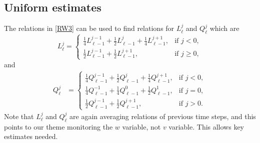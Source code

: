 \documentclass[a4paper,11pt]{article}
\def\l{{h}}
\theoremstyle{remark}
\begin{document}
\subsection{Uniform estimates}
The relations in \eqref{RW3} can be used to find relations for $L^j_\ell$ and $Q^j_\ell$ which are
\begin{equation} \label{eq:L}
L^j_\ell = \left\{\begin{array}{ll}
        \frac{1}{4}L_{\ell-1}^{j-1} + \frac{1}{2}L_{\ell-1}^j +
        \frac{1}{4}L_{\ell-1}^{j+1}, & \text{if $j<0$},\\
        \frac{1}{2}L_{\ell-1}^{j-1} + \frac{1}{2}L_{\ell-1}^{j+1}, &
        \text{if $j\ge0$},
        \end{array}\right.
\end{equation}
and
\begin{equation}\label{eq:Q}
\begin{aligned}
Q^j_\ell %
&=\left\{\begin{array}{ll}
        \frac{1}{4}Q_{\ell-1}^{j-1} + \frac{1}{2}Q_{\ell-1}^{j} +
        \frac{1}{4}Q_{\ell-1}^{j+1}, & \text{if $j<0$},\\
        \frac{1}{4}Q_{\ell-1}^{-1} + \frac{1}{4}Q_{\ell-1}^{0} +
        \frac{1}{2}Q_{\ell-1}^{1}, & \text{if $j=0$},\\
        \frac{1}{2}Q_{\ell-1}^{j-1} + \frac{1}{2}Q_{\ell-1}^{j+1}, &
        \text{if $j>0$}.
        \end{array}\right.
 \end{aligned}
\end{equation}
Note that $L^j_\ell$ and $Q^j_\ell$ are again averaging relations of previous time steps, and this points to our theme monitoring the $w$ variable, not $v$ variable. This allows key estimates needed.
\end{document}
